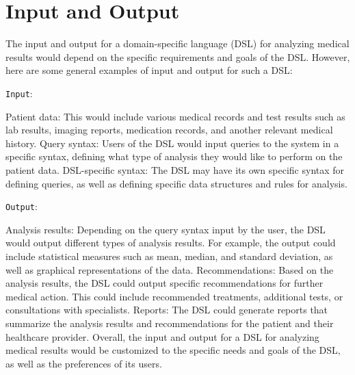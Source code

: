 \section{Input and Output}

The input and output for a domain-specific language (DSL) for analyzing medical results would depend on the specific requirements and goals of the DSL. However, here are some general examples of input and output for such a DSL:

\texttt{Input}:

Patient data: This would include various medical records and test results such as lab results, imaging reports, medication records, and another relevant medical history.
Query syntax: Users of the DSL would input queries to the system in a specific syntax, defining what type of analysis they would like to perform on the patient data.
DSL-specific syntax: The DSL may have its own specific syntax for defining queries, as well as defining specific data structures and rules for analysis.

\texttt{Output}:

Analysis results: Depending on the query syntax input by the user, the DSL would output different types of analysis results. For example, the output could include statistical measures such as mean, median, and standard deviation, as well as graphical representations of the data.
Recommendations: Based on the analysis results, the DSL could output specific recommendations for further medical action. This could include recommended treatments, additional tests, or consultations with specialists.
Reports: The DSL could generate reports that summarize the analysis results and recommendations for the patient and their healthcare provider.
Overall, the input and output for a DSL for analyzing medical results would be customized to the specific needs and goals of the DSL, as well as the preferences of its users.
